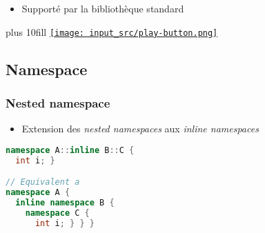 \documentclass[C++.tex]{subfiles}
\begin{document}
\begin{frame}[fragile]
\begin{itemize}
		\item Supporté par la bibliothèque standard
	\end{itemize}

	\vskip 10mm plus 10fill
	\hfill
	\href{https://godbolt.org/#g:!((g:!((g:!((h:codeEditor,i:(filename:'1',fontScale:14,fontUsePx:'0',j:1,lang:c%2B%2B,selection:(endColumn:1,endLineNumber:37,positionColumn:1,positionLineNumber:37,selectionStartColumn:1,selectionStartLineNumber:1,startColumn:1,startLineNumber:1),source:'%23include+%3Ccompare%3E%0A%23include+%3Ciostream%3E%0A%0Astruct+Foo%0A%7B%0A++int+value%3B%0A%0A%23if+1%0A++auto+operator%3C%3D%3E(const+Foo%26+rhs)+const%0A++%7B%0A++++return+value+%3C%3D%3E+rhs.value%3B%0A++%7D%0A%23endif%0A%0A%23if+0%0A++bool+operator%3D%3D(const+Foo%26+rhs)+const+%3D+default%3B%0A%23endif%0A%0A%23if+0%0A++auto+operator%3C%3D%3E(const+Foo%26+rhs)+const+%3D+default%3B%0A%23endif%0A%7D%3B%0A%0Aint+main()%0A%7B%0A++Foo+foo1%7B2011%7D%3B%0A++Foo+foo2%7B2014%7D%3B%0A%0A++std::cout+%3C%3C+std::boolalpha%3B%0A++std::cout+%3C%3C+(foo1+%3C+foo2)+%3C%3C+%22%5Cn%22%3B%0A++std::cout+%3C%3C+(foo1+%3E+foo2)+%3C%3C+%22%5Cn%22%3B%0A%23if+0%0A++std::cout+%3C%3C+(foo1+%3D%3D+foo2)+%3C%3C+%22%5Cn%22%3B%0A++std::cout+%3C%3C+(foo1+!!%3D+foo2)+%3C%3C+%22%5Cn%22%3B%0A%23endif%0A%7D%0A'),l:'5',n:'0',o:'C%2B%2B+source+%231',t:'0')),k:50,l:'4',n:'0',o:'',s:0,t:'0'),(g:!((h:executor,i:(argsPanelShown:'1',compilationPanelShown:'0',compiler:g122,compilerName:'',compilerOutShown:'0',execArgs:'',execStdin:'',fontScale:14,fontUsePx:'0',j:1,lang:c%2B%2B,libs:!((name:boost,ver:'175')),options:'-std%3Dc%2B%2B20+-Wall+-Wextra+-pedantic',source:1,stdinPanelShown:'1',tree:'1',wrap:'0'),l:'5',n:'0',o:'Executor+x86-64+gcc+12.2+(C%2B%2B,+Editor+%231)',t:'0')),header:(),k:50,l:'4',n:'0',o:'',s:0,t:'0')),l:'2',n:'0',o:'',t:'0')),version:4}{\texttt{[image: input\_src/play-button.png]}}
\end{frame}

\subsection*{Namespace}
\begin{frame}[fragile]
	\frametitle{Nested namespace}
	\begin{itemize}
		\item Extension des \textit{nested namespaces} aux \textit{inline namespaces}
	\end{itemize}

	\begin{lstlisting}[language=C++]
namespace A::inline B::C { 
  int i; }

// Equivalent a
namespace A {
  inline namespace B {
    namespace C {
      int i; } } }\end{lstlisting}
\end{frame}
\end{document}
